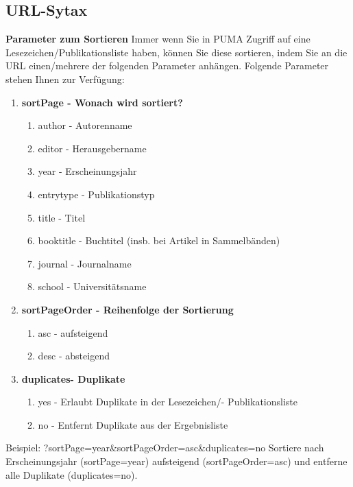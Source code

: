 \documentclass[a4paper,11pt,twoside]{scrbook}
\begin{document}
\subsection{URL-Sytax}
\textbf{Parameter zum Sortieren} \newline
Immer wenn Sie in PUMA Zugriff auf eine Lesezeichen/Publikationsliste haben, können Sie diese sortieren, indem Sie an die URL einen/mehrere der folgenden Parameter anhängen. Folgende Parameter stehen Ihnen zur Verfügung:
\begin{enumerate}
    \item \textbf{sortPage - Wonach wird sortiert?}
    \begin{enumerate}
        \item author - Autorenname
        \item editor - Herausgebername
        \item year - Erscheinungsjahr
        \item entrytype - Publikationstyp
        \item title - Titel
        \item booktitle - Buchtitel (insb. bei Artikel in Sammelbänden)
        \item journal - Journalname
        \item school - Universitätsname 
    \end{enumerate}
    \item \textbf{sortPageOrder - Reihenfolge der Sortierung}
    \begin{enumerate}
        \item asc - aufsteigend
        \item desc - absteigend 
    \end{enumerate}
    \item \textbf{duplicates- Duplikate}
    \begin{enumerate}
        \item yes - Erlaubt Duplikate in der Lesezeichen/- Publikationsliste
        \item no - Entfernt Duplikate aus der Ergebnisliste
    \end{enumerate}
\end{enumerate}
Beispiel: ?sortPage=year\&sortPageOrder=asc\&duplicates=no \newline
Sortiere nach Erscheinungsjahr (sortPage=year) aufsteigend (sortPageOrder=asc) und entferne alle Duplikate (duplicates=no). \newline
\end{document}

